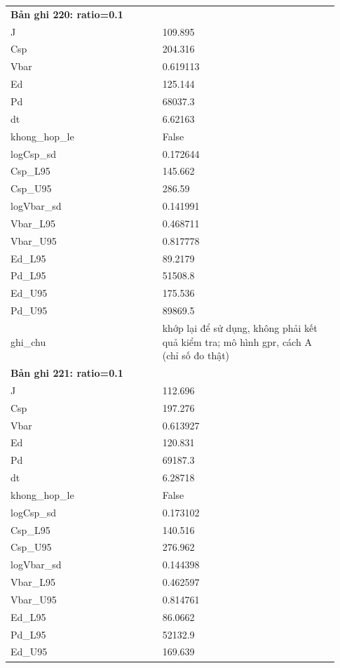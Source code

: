 \begin{longtable}{p{0.43\linewidth}p{0.50\linewidth}}
\midrule
\multicolumn{2}{p{0.95\linewidth}}{\textbf{Bản ghi 220: ratio=0.1}} \\
J & 109.895 \\
Csp & 204.316 \\
Vbar & 0.619113 \\
Ed & 125.144 \\
Pd & 68037.3 \\
dt & 6.62163 \\
khong\_\allowbreak hop\_\allowbreak le & False \\
logCsp\_\allowbreak sd & 0.172644 \\
Csp\_\allowbreak L95 & 145.662 \\
Csp\_\allowbreak U95 & 286.59 \\
logVbar\_\allowbreak sd & 0.141991 \\
Vbar\_\allowbreak L95 & 0.468711 \\
Vbar\_\allowbreak U95 & 0.817778 \\
Ed\_\allowbreak L95 & 89.2179 \\
Pd\_\allowbreak L95 & 51508.8 \\
Ed\_\allowbreak U95 & 175.536 \\
Pd\_\allowbreak U95 & 89869.5 \\
ghi\_\allowbreak chu & khớp lại để sử dụng, không phải kết quả kiểm tra; mô hình gpr, cách A (chỉ số đo thật) \\
\midrule
\multicolumn{2}{p{0.95\linewidth}}{\textbf{Bản ghi 221: ratio=0.1}} \\
J & 112.696 \\
Csp & 197.276 \\
Vbar & 0.613927 \\
Ed & 120.831 \\
Pd & 69187.3 \\
dt & 6.28718 \\
khong\_\allowbreak hop\_\allowbreak le & False \\
logCsp\_\allowbreak sd & 0.173102 \\
Csp\_\allowbreak L95 & 140.516 \\
Csp\_\allowbreak U95 & 276.962 \\
logVbar\_\allowbreak sd & 0.144398 \\
Vbar\_\allowbreak L95 & 0.462597 \\
Vbar\_\allowbreak U95 & 0.814761 \\
Ed\_\allowbreak L95 & 86.0662 \\
Pd\_\allowbreak L95 & 52132.9 \\
Ed\_\allowbreak U95 & 169.639 \\

\end{longtable}
